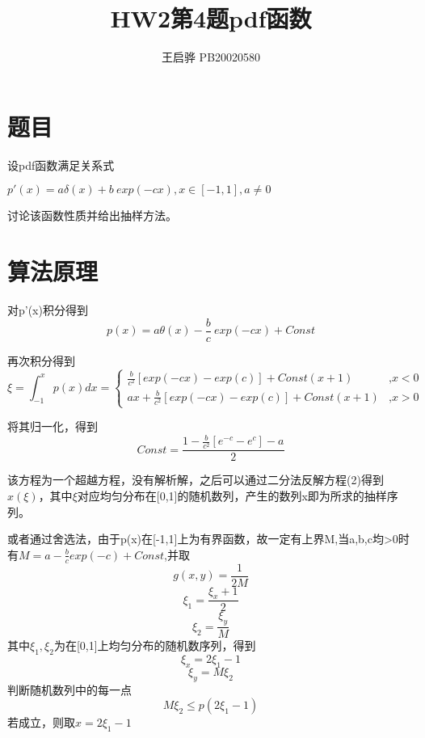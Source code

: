 \documentclass{article}
\title{\songti \zihao{2}\bfseries HW2第4题pdf函数}
\author{王启骅 PB20020580}
\begin{document}
	\maketitle
	\section{题目}
	设pdf函数满足关系式
	\begin{center}
		$ p'(x)=a\delta(x)+b\ exp(-cx) ,x\in[-1,1],a\neq 0$
	\end{center}
	讨论该函数性质并给出抽样方法。
	\section{算法原理}
对p'(x)积分得到
\begin{equation}
	p(x)=a\theta(x)-\frac{b}{c}\ exp(-cx)+Const
\end{equation}


再次积分得到
	\begin{equation}
		\xi=\int_{-1}^{x}p(x)dx=
		\begin{cases}
			\frac{b}{c^2}[exp(-cx)-exp(c)]+Const(x+1)& \text{,$x<0 $}\\
			ax+\frac{b}{c^2}[exp(-cx)-exp(c)]+Const(x+1)& \text{,$x>0 $}
		\end{cases}
	\end{equation}
	
	
	将其归一化，得到
	\begin{equation}
		Const=\frac{1-\frac{b}{c^2}[e^{-c}-e^c]-a}{2}
	\end{equation}


	该方程为一个超越方程，没有解析解，之后可以通过二分法反解方程(2)得到$ x(\xi) $，其中$ \xi $对应均匀分布在[0,1]的随机数列，产生的数列x即为所求的抽样序列。
	
	
	或者通过舍选法，由于p(x)在[-1,1]上为有界函数，故一定有上界M,当a,b,c均>0时有$ M=a-\frac{b}{c}exp(-c)+Const $,并取
	\begin{equation}
		g(x,y)=\frac{1}{2M}
	\end{equation}
	\begin{equation}
		\xi_1=\frac{\xi_x+1}{2}
	\end{equation}
	\begin{equation}
		\xi_2=\frac{\xi_y}{M}
	\end{equation}
	其中$ \xi_1,\xi_2 $为在[0,1]上均匀分布的随机数序列，得到
	\begin{equation}
		\xi_x=2\xi_1-1
	\end{equation}
	\begin{equation}
		\xi_y=M\xi_2
	\end{equation}
	判断随机数列中的每一点
	\begin{equation}
		M\xi_2\le p(2\xi_1-1)
	\end{equation}
	若成立，则取$ x=2\xi_1-1 $
\end{document}

